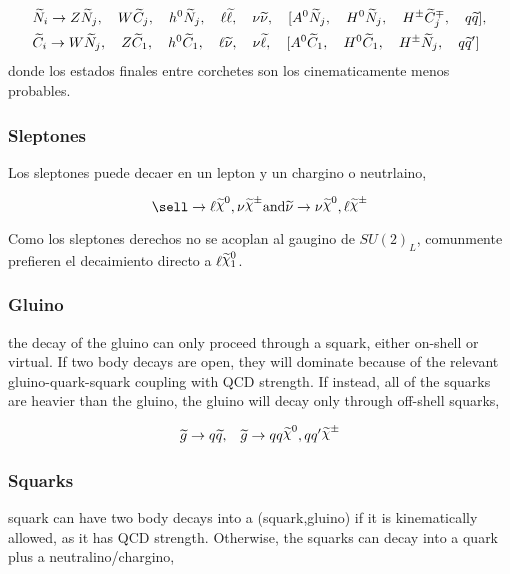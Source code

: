\begin{align*}
  &\widetilde{N}_i \rightarrow Z \widetilde{N}_j, \quad W \widetilde{C}_j, \quad h^0 \widetilde{N}_j, \quad \ell \widetilde{\ell}, \quad \nu \widetilde{\nu}, \quad
  [A^0 \widetilde{N}_j, \quad H^0 \widetilde{N}_j, \quad H^{\pm} \widetilde{C}_j^{\mp}, \quad q \widetilde{q}], \\
  &\widetilde{C}_i \rightarrow W \widetilde{N}_j, \quad Z \widetilde{C}_1, \quad h^0 \widetilde{C}_1, \quad \ell \widetilde{\nu}, \quad \nu \widetilde{\ell}, \quad
  [A^0 \widetilde{C}_1, \quad H^0 \widetilde{C}_1, \quad H^{\pm} \widetilde{N}_j, \quad q \widetilde{q}']
\end{align*}
%
donde los estados finales entre corchetes son los cinematicamente menos probables.

\subsubsection{Sleptones}

Los sleptones puede decaer en un lepton y un chargino o neutrlaino,

\begin{equation}
  \sell \to \ell \nino, \nu\chinopm \text{and} \snu \to \nu\nino, \ell\chinopm
\end{equation}

Como los sleptones derechos no se acoplan al gaugino de $SU(2)_L$,
comunmente prefieren el decaimiento directo a $\ell\ninoone$.

\subsubsection{Gluino}

the decay of the gluino can only proceed through a squark,
either on-shell or virtual. If two body decays are open, they will dominate
because of the relevant gluino-quark-squark coupling with QCD strength. If
instead, all of the squarks are heavier than the gluino, the gluino will decay
only through off-shell squarks,

\begin{align}
  &\gluino \to q\susy{q},
  &\gluino \to qq\nino, qq^\prime \chinopm
\end{align}


\subsubsection{Squarks}

squark can have two body decays into a (squark,gluino) if it
is kinematically allowed, as it has QCD strength. Otherwise, the squarks can
decay into a quark plus a neutralino/chargino,

